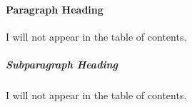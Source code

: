 \documentclass[
DToption=dissertation,%
wsudraft,
]{wsu}
\begin{document}
















\paragraph{Paragraph Heading}
I will not appear in the table of contents.
\lipsum[1]

\subparagraph{Subparagraph Heading}
I will not appear in the table of contents.
\lipsum[1]
\end{document}
